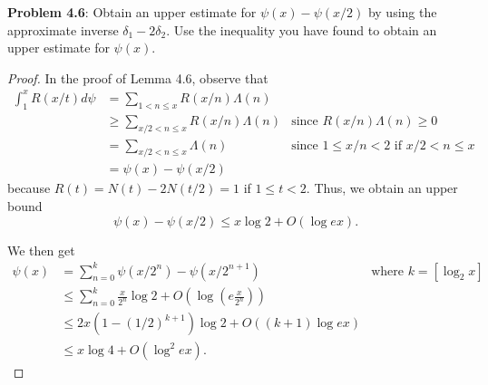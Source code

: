 \documentclass[12pt]{article}
\renewcommand{\O}[1]{O\left(#1\right)}
\begin{document}
\fi

\textbf{Problem 4.6}: Obtain an upper estimate for $\psi(x) - \psi(x/2)$ by using the approximate inverse $\delta_1 - 2\delta_2$. Use the inequality you have found to obtain an upper estimate for $\psi(x)$.

\begin{proof}
In the proof of Lemma 4.6, observe that
\begin{align*}
\int_1^x R(x/t) d\psi &= \sum_{1 < n \leq x} R(x/n) \Lambda(n)\\
&\geq \sum_{x/2 < n \leq x} R(x/n) \Lambda(n) &\text{since }R(x/n) \Lambda(n) \geq 0\\
&= \sum_{x/2 < n \leq x} \Lambda(n) &\text{since } 1 \leq x/n < 2 \text{ if } x/2 < n \leq x\\
&= \psi(x) - \psi(x/2)
\end{align*}
because $R(t) = N(t) - 2N(t/2) = 1$ if $1 \leq t < 2$. Thus, we obtain an upper bound
$$\psi(x) - \psi(x/2) \leq x \log 2 + \O{ \log ex }.$$

We then get
\begin{align*}
\psi(x) &= \sum_{n = 0}^{k} \psi(x/2^n) - \psi(x/2^{n+1}) &\text{where } k = [\log_2 x]\\
&\leq \sum_{n = 0}^{k} \frac{x}{2^n} \log 2 + \O{ \log\left( e\frac{x}{2^n} \right) }\\
&\leq 2 x (1 - (1/2)^{k+1}) \log 2 + \O{ (k + 1) \log ex }\\
&\leq x \log 4 + \O{ \log^2 ex }.
\end{align*}
\end{proof}

\unless\ifdefined\IsMainDocument
\end{document}
